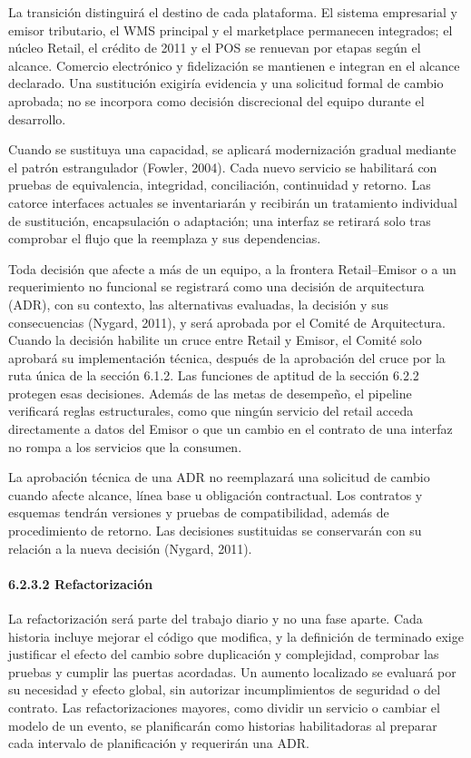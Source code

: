 \documentclass[11pt]{article}
\begin{document}
La transición distinguirá el destino de cada plataforma. El sistema
empresarial y emisor tributario, el WMS principal y el marketplace
permanecen integrados; el núcleo Retail, el crédito de 2011 y el POS se
renuevan por etapas según el alcance. Comercio electrónico y
fidelización se mantienen e integran en el alcance declarado. Una
sustitución exigiría evidencia y una solicitud formal de cambio
aprobada; no se incorpora como decisión discrecional del equipo durante
el desarrollo.

Cuando se sustituya una capacidad, se aplicará modernización gradual
mediante el patrón estrangulador (Fowler, 2004). Cada nuevo servicio se
habilitará con pruebas de equivalencia, integridad, conciliación,
continuidad y retorno. Las catorce interfaces actuales se inventariarán
y recibirán un tratamiento individual de sustitución, encapsulación o
adaptación; una interfaz se retirará solo tras comprobar el flujo que la
reemplaza y sus dependencias.

Toda decisión que afecte a más de un equipo, a la frontera
Retail--Emisor o a un requerimiento no funcional se registrará como una
decisión de arquitectura (ADR), con su contexto, las alternativas
evaluadas, la decisión y sus consecuencias (Nygard, 2011), y será aprobada por el Comité de Arquitectura. Cuando la decisión habilite un cruce entre Retail y Emisor, el Comité solo aprobará su implementación técnica, después de la aprobación del cruce por la ruta única de la sección 6.1.2. Las funciones de aptitud de la
sección 6.2.2 protegen esas decisiones. Además de las metas de
desempeño, el pipeline verificará reglas estructurales, como que ningún
servicio del retail acceda directamente a datos del Emisor o que un
cambio en el contrato de una interfaz no rompa a los servicios que la
consumen.

La aprobación técnica de una ADR no reemplazará una solicitud de cambio
cuando afecte alcance, línea base u obligación contractual. Los
contratos y esquemas tendrán versiones y pruebas de compatibilidad,
además de procedimiento de retorno. Las decisiones sustituidas se
conservarán con su relación a la nueva decisión (Nygard, 2011).

\paragraph{6.2.3.2 Refactorización}\label{6-2-3-2-refactorizacion}

La refactorización será parte del trabajo diario y no una fase aparte. Cada historia incluye mejorar el código que modifica, y la definición de terminado exige justificar el efecto del cambio sobre duplicación y complejidad, comprobar las pruebas y cumplir las puertas acordadas. Un aumento localizado se evaluará por su necesidad y efecto global, sin autorizar incumplimientos de seguridad o del contrato. Las refactorizaciones mayores, como dividir un servicio o cambiar el modelo de un evento, se planificarán como historias habilitadoras al preparar cada intervalo de planificación y requerirán una ADR.
\end{document}
